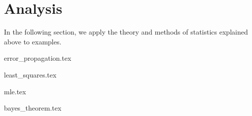 \section{Analysis}
\label{sec:analysis}
In the following section, we apply the theory and methods of statistics explained above to examples.

{error_propagation.tex}

{least_squares.tex}

{mle.tex}

{bayes_theorem.tex}